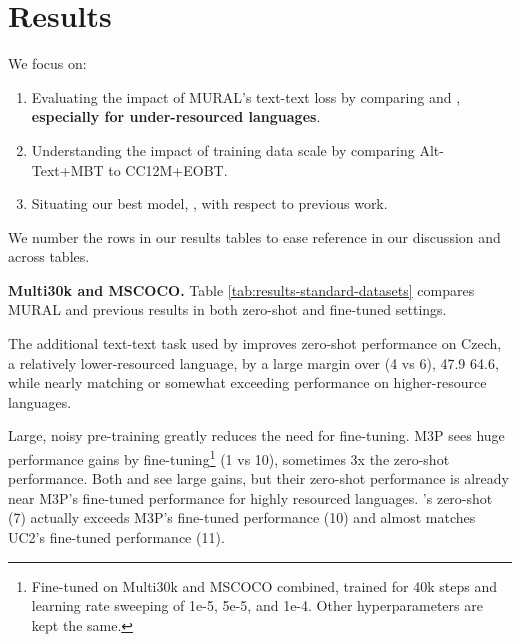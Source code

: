         
        \section{Results}
        


        We focus on:
        
        \begin{enumerate}
            \item Evaluating the impact of MURAL's text-text loss by comparing \alignmling and \muralbase, \textbf{especially for under-resourced languages}.
            \item Understanding the impact of training data scale by comparing Alt-Text+MBT to CC12M+EOBT.
            \item Situating our best model, \murallarge, with respect to previous work.
        \end{enumerate}
        \noindent
        We number the rows in our results tables to ease reference in our discussion and across tables.
        
        \textbf{Multi30k and MSCOCO.} Table \ref{tab:results-standard-datasets} compares MURAL and previous results \cite{burns2020eccv, huang2020m3p,zhou2021uc2, jia2021scaling} in both zero-shot and fine-tuned settings.
        
        The additional text-text task used by \muralbase improves zero-shot performance on Czech, a relatively lower-resourced language, by a large margin over \alignmling (4 vs 6), 47.9  64.6,  while nearly matching or somewhat exceeding performance on higher-resource languages. 
        
        Large, noisy pre-training greatly reduces the need for fine-tuning. M3P sees huge performance gains by fine-tuning\footnote{Fine-tuned on Multi30k and MSCOCO combined, trained for 40k steps and learning rate sweeping of 1e-5, 5e-5, and 1e-4. Other hyperparameters are kept the same.} (1 vs 10), sometimes 3x the zero-shot performance. Both \alignmling and \muralbase see large gains, but their zero-shot performance is already near M3P's fine-tuned performance for highly resourced languages. \murallarge's zero-shot (7) actually exceeds M3P's fine-tuned performance (10) and almost matches UC2's fine-tuned performance (11).
        
